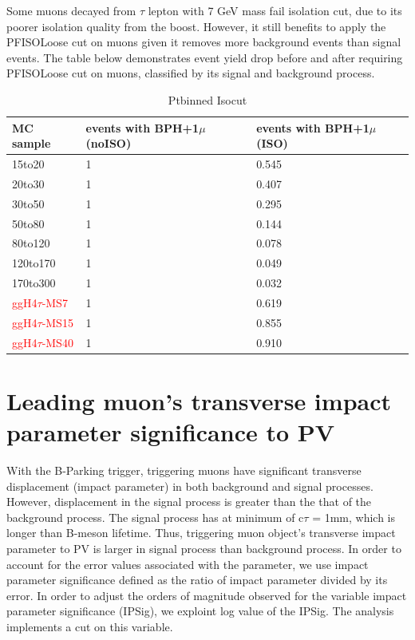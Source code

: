 Some muons decayed from $\tau$ lepton with 7 GeV mass fail isolation cut, due to its poorer isolation quality from the boost.
However, it still benefits to apply the PFISOLoose cut on muons given it removes more background events than signal events.
The table below demonstrates event yield drop before and after requiring PFISOLoose cut on muons, classified by its signal and background process. 

\begin{tiny}
    \begin{table}
  \centering
\begin{tabular}{|p{3cm}|p{2cm}|p{2cm}|}
\hline
MC sample & events with BPH+1$\mu$ (noISO) & events with BPH+1$\mu$ (ISO) \\
\hline
 15to20 & 1 & 0.545 \\
 \hline
 20to30 & 1 & 0.407 \\
\hline
 30to50 & 1 & 0.295 \\
\hline
 50to80 & 1 & 0.144 \\
\hline
 80to120 & 1 & 0.078 \\
\hline
120to170 & 1 & 0.049 \\
\hline
170to300 & 1 & 0.032 \\
\hline
\textcolor{red}{ggH4$\tau$-MS7}& 1 & 0.619 \\
\hline
\textcolor{red}{ggH4$\tau$-MS15} & 1 & 0.855 \\
\hline
\textcolor{red}{ggH4$\tau$-MS40} & 1 & 0.910 \\
 \hline
    \end{tabular}
    \caption{Ptbinned Isocut}
    \end{table}
\end{tiny}    


\section{Leading muon's transverse impact parameter significance to PV}\label{ref:muIP}
With the B-Parking trigger, triggering muons have significant transverse displacement (impact parameter) in both background and signal processes.
However, displacement in the signal process is greater than the that of the background process.
The signal process has at minimum of c$\tau$ = 1mm, which is longer than B-meson lifetime.
Thus, triggering muon object's transverse impact parameter to PV is larger in signal process than background process.
In order to account for the error values associated with the parameter, we use impact parameter significance defined as the ratio of impact parameter divided by its error.
In order to adjust the orders of magnitude observed for the variable impact parameter significance (IPSig), we exploint log value of the IPSig.
The analysis implements a cut on this variable.


